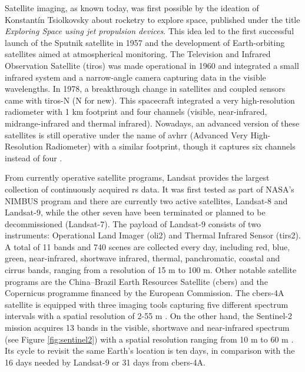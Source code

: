 Satellite imaging, as known today, was first possible by the ideation of Konstantín Tsiolkovsky about rocketry to explore space, published under the title \textit{Exploring Space using jet propulsion devices}. This idea led to the first successful launch of the Sputnik satellite in 1957 and the development of Earth-orbiting satellites aimed at atmospherical monitoring. The Television and Infrared Observation Satellite (\acrshort{tiros}) was made operational in 1960 and integrated a small infrared system and a narrow-angle camera capturing data in the visible wavelengths. In 1978, a breakthrough change in satellites and coupled sensors came with \acrshort{tiros}-N (N for new). This spacecraft integrated a very high-resolution radiometer with 1 \si{\kilo\meter} footprint and four channels (visible, near-infrared, midrange-infrared and thermal infrared). Nowadays, an advanced version of these satellites is still operative under the name of \acrshort{avhrr} (Advanced Very High-Resolution Radiometer) with a similar footprint, though it captures six channels instead of four \cite{national_oceanic_and_atmospheric_administration_avhrr3_nodate}.   

From currently operative satellite programs, Landsat provides the largest collection of continuously acquired \acrshort{rs} data. It was first tested as part of NASA's NIMBUS program and there are currently two active satellites, Landsat-8 and Landsat-9, while the other seven have been terminated or planned to be decommissioned (Landsat-7). The payload of Landsat-9 consists of two instruments: Operational Land Imager (\acrshort{oli2}) and Thermal Infrared Sensor (\acrshort{tirs2}). A total of 11 bands and 740 scenes are collected every day, including red, blue, green, near-infrared, shortwave infrared, thermal, panchromatic, coastal and cirrus bands, ranging from a resolution of 15 \si{\meter} to 100 \si{\meter}. Other notable satellite programs are the China–Brazil Earth Resources Satellite (\acrshort{cbers}) and the Copernicus programme financed by the European Commission. The \acrshort{cbers}-4A satellite is equipped with three imaging tools capturing five different spectrum intervals with a spatial resolution of 2-55 \si{\meter} \cite{instituto_nacional_de_pesquisas_espaciais_inpecbers_2019}. On the other hand, the Sentinel-2 mission acquires 13 bands in the visible, shortwave and near-infrared spectrum (see Figure \ref{fig:sentinel2}) with a spatial resolution ranging from 10 \si{\meter} to 60 \si{\meter} \cite{european_environment_agency_eu_2017}. Its cycle to revisit the same Earth's location is ten days, in comparison with the 16 days needed by Landsat-9 or 31 days from \acrshort{cbers}-4A.

